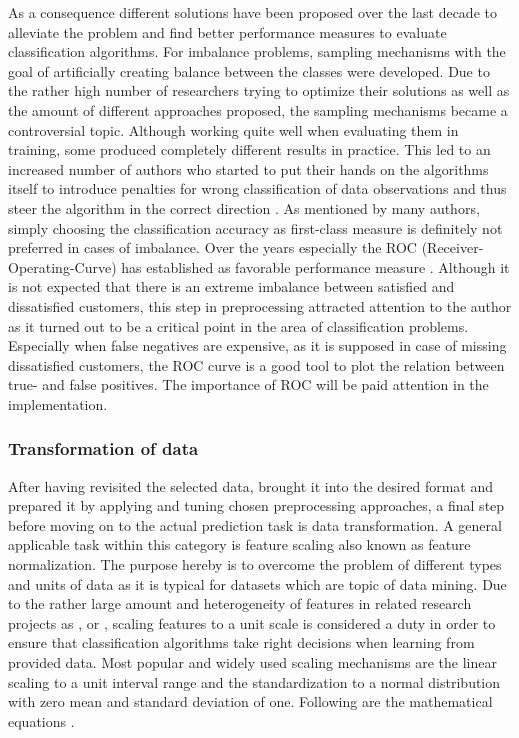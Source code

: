 \newline
\newline
As a consequence different solutions have been proposed over the last decade to alleviate the problem and find better performance measures to evaluate classification algorithms. For imbalance problems, sampling mechanisms with the goal of artificially creating balance between the classes were developed. Due to the rather high number of researchers trying to optimize their solutions as well as the amount of different approaches proposed, the sampling mechanisms became a controversial topic. Although working quite well when evaluating them in training, some produced completely different results in practice. This led to an increased number of authors who started to put their hands on the algorithms itself to introduce penalties for wrong classification of data observations and thus steer the algorithm in the correct direction \cite{chawla2004special}. As mentioned by many authors, simply choosing the classification accuracy as first-class measure is definitely not preferred in cases of imbalance. Over the years especially the ROC (Receiver-Operating-Curve) has established as favorable performance measure \cite{fawcett2006introduction}. Although it is not expected that there is an extreme imbalance between satisfied and dissatisfied customers, this step in preprocessing attracted attention to the author as it turned out to be a critical point in the area of classification problems. Especially when false negatives are expensive, as it is supposed in case of missing dissatisfied customers, the ROC curve is a good tool to plot the relation between true- and false positives. The importance of ROC will be paid attention in the implementation.

\subsubsection{Transformation of data}
\label{sssec:manipulationData}
After having revisited the selected data, brought it into the desired format and prepared it by applying and tuning chosen preprocessing approaches, a final step before moving on to the actual prediction task is data transformation. A general applicable task within this category is feature scaling also known as feature normalization. The purpose hereby is to overcome the problem of different types and units of data as it is typical for datasets which are topic of data mining. Due to the rather large amount and heterogeneity of features in related research projects as \cite{mozer2000predicting}, \cite{meinzer2016can} or \cite{zhao2005customer}, scaling features to a unit scale is considered a duty in order to ensure that classification algorithms take right decisions when learning from provided data. Most popular and widely used scaling mechanisms are the linear scaling to a unit interval range and the standardization to a normal distribution with zero mean and standard deviation of one. Following are the mathematical equations \cite{aksoy2001feature}. 

